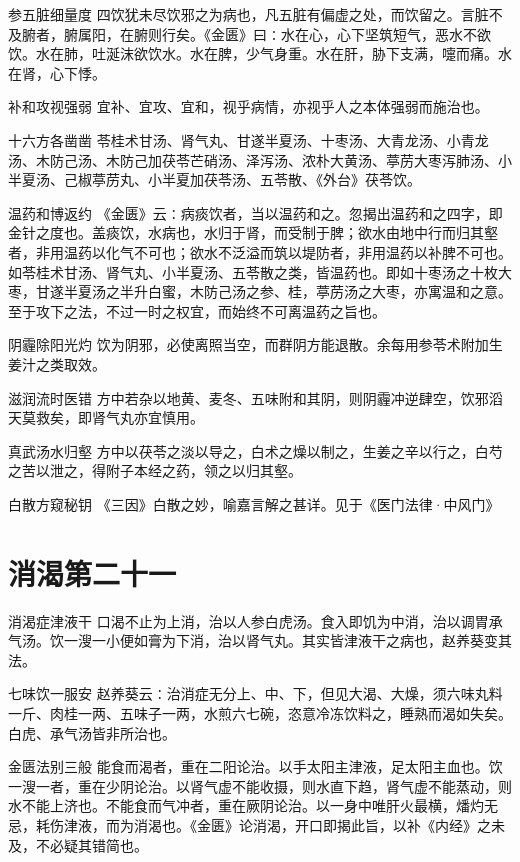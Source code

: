 \documentclass[a4paper,12pt,UTF8,twoside]{ctexbook}
\begin{document}
    参五脏细量度
    四饮犹未尽饮邪之为病也，凡五脏有偏虚之处，而饮留之。言脏不及腑者，腑属阳，在腑则行矣。《金匮》曰∶水在心，心下坚筑短气，恶水不欲饮。水在肺，吐涎沫欲饮水。水在脾，少气身重。水在肝，胁下支满，嚏而痛。水在肾，心下悸。
    
    补和攻视强弱
    宜补、宜攻、宜和，视乎病情，亦视乎人之本体强弱而施治也。
    
    十六方各凿凿
    苓桂术甘汤、肾气丸、甘遂半夏汤、十枣汤、大青龙汤、小青龙汤、木防己汤、木防己加茯苓芒硝汤、泽泻汤、浓朴大黄汤、葶苈大枣泻肺汤、小半夏汤、己椒葶苈丸、小半夏加茯苓汤、五苓散、《外台》茯苓饮。
    
    温药和博返约
    《金匮》云∶病痰饮者，当以温药和之。忽揭出温药和之四字，即金针之度也。盖痰饮，水病也，水归于肾，而受制于脾；欲水由地中行而归其壑者，非用温药以化气不可也；欲水不泛溢而筑以堤防者，非用温药以补脾不可也。如苓桂术甘汤、肾气丸、小半夏汤、五苓散之类，皆温药也。即如十枣汤之十枚大枣，甘遂半夏汤之半升白蜜，木防己汤之参、桂，葶苈汤之大枣，亦寓温和之意。至于攻下之法，不过一时之权宜，而始终不可离温药之旨也。
    
    阴霾除阳光灼
    饮为阴邪，必使离照当空，而群阴方能退散。余每用参苓术附加生姜汁之类取效。
    
    滋润流时医错
    方中若杂以地黄、麦冬、五味附和其阴，则阴霾冲逆肆空，饮邪滔天莫救矣，即肾气丸亦宜慎用。
    
    真武汤水归壑
    方中以茯苓之淡以导之，白术之燥以制之，生姜之辛以行之，白芍之苦以泄之，得附子本经之药，领之以归其壑。
    
    白散方窥秘钥
    《三因》白散之妙，喻嘉言解之甚详。见于《医门法律·中风门》
    
    
    
    \chapter{消渴第二十一}
        
    消渴症津液干
    口渴不止为上消，治以人参白虎汤。食入即饥为中消，治以调胃承气汤。饮一溲一小便如膏为下消，治以肾气丸。其实皆津液干之病也，赵养葵变其法。
    
    七味饮一服安
    赵养葵云∶治消症无分上、中、下，但见大渴、大燥，须六味丸料一斤、肉桂一两、五味子一两，水煎六七碗，恣意冷冻饮料之，睡熟而渴如失矣。白虎、承气汤皆非所治也。
    
    金匮法别三般
    能食而渴者，重在二阳论治。以手太阳主津液，足太阳主血也。饮一溲一者，重在少阴论治。以肾气虚不能收摄，则水直下趋，肾气虚不能蒸动，则水不能上济也。不能食而气冲者，重在厥阴论治。以一身中唯肝火最横，燔灼无忌，耗伤津液，而为消渴也。《金匮》论消渴，开口即揭此旨，以补《内经》之未及，不必疑其错简也。
    
\end{document}
